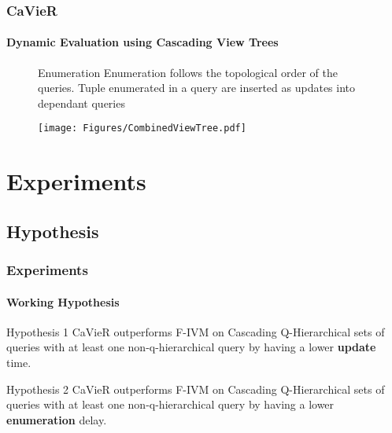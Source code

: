 \documentclass[
	11pt, %
]{beamer}
\begin{document}
\begin{frame}
	\frametitle{CaVieR}
	\framesubtitle{Dynamic Evaluation using Cascading View Trees}
	\begin{figure}
		\begin{minipage}{0.5\textwidth}
		\begin{block}{Enumeration}
			Enumeration follows the topological order of the queries. Tuple enumerated in a query are inserted as updates into dependant queries
		\end{block}
		\end{minipage}
		\begin{minipage}{0.49\textwidth}
			\vspace{-0.8cm}
			\texttt{[image: Figures/CombinedViewTree.pdf]}
		\end{minipage}
	\end{figure}
\end{frame}



\section{Experiments}
\subsection{Hypothesis}
\begin{frame}
	\frametitle{Experiments}
	\framesubtitle{Working Hypothesis}
	\begin{block}{Hypothesis 1 }\label{hyp:initialUpdate}
		CaVieR outperforms F-IVM on Cascading Q-Hierarchical sets of queries with at least one non-q-hierarchical query by having a lower \textbf{update} time.
	\end{block}
	
	\begin{block}{Hypothesis 2}\label{hyp:initialEnumeration}
		CaVieR outperforms F-IVM on Cascading Q-Hierarchical sets of queries with at least one non-q-hierarchical query by having a lower \textbf{enumeration} delay.
	\end{block}

\end{frame}
\end{document}
